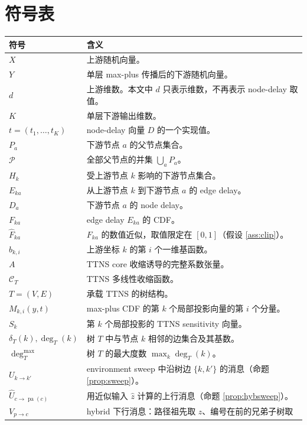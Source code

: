 \documentclass[a4paper,11pt]{article}
\theoremstyle{definition}
\newcommand{\1}{\mathbf 1}
\newcommand{\pa}{\operatorname{pa}}
\newcommand{\Pset}{\mathcal P}
\begin{document}
\section{符号表}

\begin{longtable}{>{\raggedright\arraybackslash}p{}
                  >{\raggedright\arraybackslash}p{}}
\toprule
符号 & 含义\\
\midrule
\endhead
$X$ & 上游随机向量。\\
$Y$ & 单层 max-plus 传播后的下游随机向量。\\
$d$ & 上游维数。本文中 $d$ 只表示维数，不再表示 node-delay 取值。\\
$K$ & 单层下游输出维数。\\
$t=(t_1,\ldots,t_K)$ & node-delay 向量 $D$ 的一个实现值。\\
$P_a$ & 下游节点 $a$ 的父节点集合。\\
$\Pset$ & 全部父节点的并集 $\bigcup_a P_a$。\\
$H_k$ & 受上游节点 $k$ 影响的下游节点集合。\\
$E_{ka}$ & 从上游节点 $k$ 到下游节点 $a$ 的 edge delay。\\
$D_a$ & 下游节点 $a$ 的 node delay。\\
$F_{ka}$ & edge delay $E_{ka}$ 的 CDF。\\
$\widehat F_{ka}$ & $F_{ka}$ 的数值近似，取值限定在 $[0,1]$（假设
\ref{ass:clip}）。\\
$b_{k,i}$ & 上游坐标 $k$ 的第 $i$ 个一维基函数。\\
$A$ & TTNS core 收缩诱导的完整系数张量。\\
$\mathcal C_T$ & TTNS 多线性收缩函数。\\
$T=(V,E)$ & 承载 TTNS 的树结构。\\
$M_{k,i}(y,t)$ & max-plus CDF 的第 $k$ 个局部投影向量的第 $i$ 个分量。\\
$S_k$ & 第 $k$ 个局部投影的 TTNS sensitivity 向量。\\
$\delta_T(k),\deg_T(k)$ & 树 $T$ 中与节点 $k$ 相邻的边集合及其基数。\\
$\deg_T^{\max}$ & 树 $T$ 的最大度数 $\max_k\deg_T(k)$。\\
$U_{k\to k'}$ & environment sweep 中沿树边 $\{k,k'\}$ 的消息（命题
\ref{prop:sweep}）。\\
$\widehat U_{c\to\pa(c)}$ & 用近似输入 $\widehat z$ 计算的上行消息（命题
\ref{prop:hybsweep}）。\\
$V_{p\to c}$ & hybrid 下行消息：路径祖先取 $z$、编号在前的兄弟子树取

\end{longtable}
\end{document}
